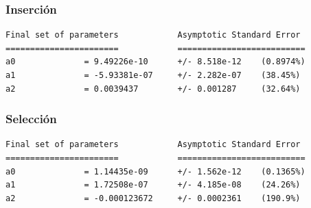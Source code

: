 \documentclass[a4]{article}
\begin{document}
\begin{figure}[H] \centering
{}
\end{figure}

\vspace{-12mm}

\subsubsection{Inserción}

\begin{verbatim}
Final set of parameters            Asymptotic Standard Error
=======================            ==========================
a0              = 9.49226e-10      +/- 8.518e-12    (0.8974%)
a1              = -5.93381e-07     +/- 2.282e-07    (38.45%)
a2              = 0.0039437        +/- 0.001287     (32.64%)
\end{verbatim}

\begin{figure}[H] \centering
{}
\end{figure}

\subsubsection{Selección}
\begin{verbatim}
Final set of parameters            Asymptotic Standard Error
=======================            ==========================
a0              = 1.14435e-09      +/- 1.562e-12    (0.1365%)
a1              = 1.72508e-07      +/- 4.185e-08    (24.26%)
a2              = -0.000123672     +/- 0.0002361    (190.9%)
\end{verbatim}
\end{document}
